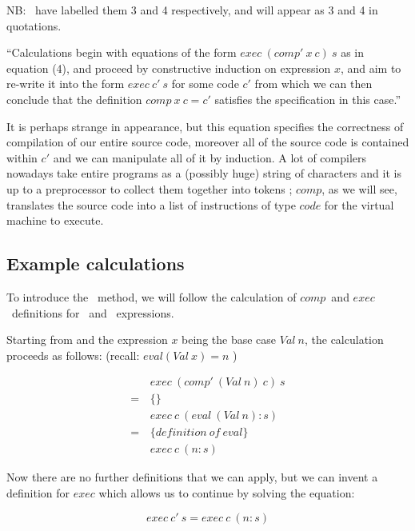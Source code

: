 \documentclass {article}
\begin{document}
NB: \BH\ have labelled them 3 and 4 respectively, 
and will appear as 3 and 4 in quotations.

\newcommand{\exec}{$exec$}
\newcommand{\comp}{$comp$}
\newcommand{\compp}{$comp'$}

``Calculations begin with equations
of the form $exec\  (comp'\  x\  c)\  s$
as in equation (4),
and proceed by constructive induction on 
expression $x$, 
and aim to re-write it into the form
$exec\  c'\  s$ for some code $c'$
from which we can then conclude that the definition
$comp\  x\  c = c'$ satisfies the 
specification in this case.''\cite{bandh}

It is perhaps strange in appearance,
but this equation
specifies the correctness of compilation of our entire source code,
moreover all of the source code is contained within  $c'$
and we can manipulate all of it by induction.
A lot of compilers nowadays 
take entire programs as a (possibly huge) string of characters
and it is up to a preprocessor to collect them together into tokens \cite{dragon};
\comp, as we will see, translates the source code into a
list of instructions of type $code$ for the virtual machine to execute.

\subsection{Example calculations}

To introduce the \BH\ method,
we will follow the 
calculation of \comp\ and \exec\ definitions
for \val\ and \add\ expressions\cite[section 2.5]{bandh}.

Starting from  and the expression $x$
being the base case $Val\ n$, 
the calculation proceeds as follows\cite{bandh}:
(recall: \( eval (Val\  x) = n  \) )

\begin{align*}
	&exec\ (comp'\ (Val\ n)\ c)\ s \\
	=\, & \{ \} \\
	&exec\ c\ (eval\ (Val\ n) : s) \\
	=& \{definition\ of\ eval\} \\
	&exec\ c\ (n:s)
\end{align*}

Now there are no further definitions that we can apply,
but we can invent a definition for $exec$ which allows
us to continue by solving the equation:

	\[ exec\ c'\ s = exec\ c\ (n : s) \]
\end{document}
